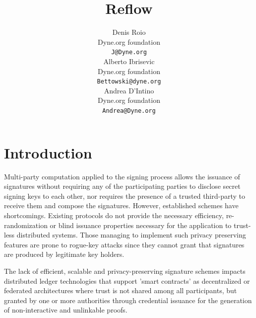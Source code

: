 \documentclass[twocolumn]{article}
\title{Reflow}
\author{
    Denis Roio \\
	Dyne.org foundation \\
	\texttt{J@Dyne.org} \\
    \And
	Alberto Ibrisevic \\
	Dyne.org foundation\\
	\texttt{Bettowski@dyne.org} \\
    \And
    Andrea D'Intino \\
    Dyne.org foundation \\
    \texttt{Andrea@Dyne.org} \\
}
\begin{document}

\section{Introduction}

Multi-party computation applied to the signing process allows the
issuance of signatures without requiring any of the participating
parties to disclose secret signing keys to each other, nor requires the
presence of a trusted third-party to receive them and compose the
signatures. However, established schemes have shortcomings. Existing
protocols do not provide the necessary efficiency, re-randomization or
blind issuance properties necessary for the application to trust-less
distributed systems. Those managing to implement such privacy preserving
features are prone to rogue-key attacks \citep{ietf-bls} since they
cannot grant that signatures are produced by legitimate key holders.

The lack of efficient, scalable and privacy-preserving signature schemes
impacts distributed ledger technologies that support 'smart contracts'
as decentralized or federated architectures where trust is not shared
among all participants, but granted by one or more authorities through
credential issuance for the generation of non-interactive and unlinkable
proofs.
\end{document}
